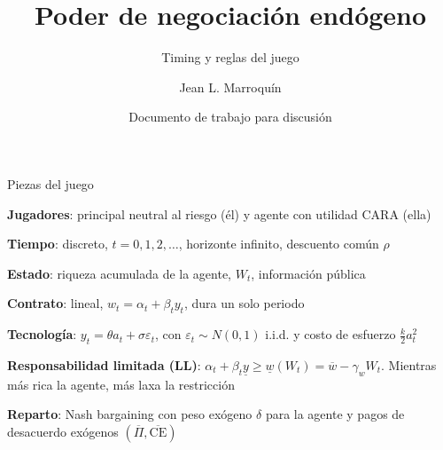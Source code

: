 \documentclass[12pt, aspectratio=169]{beamer}
\title{Poder de negociación endógeno}
\subtitle{Timing y reglas del juego}
\date{Documento de trabajo para discusión}
\author{Jean L. Marroquín}
\institute{CIDE}
\newenvironment{wideitemize}{\itemize\addtolength{\itemsep}{3pt}}{\enditemize}
\newcommand{\CE}{\text{CE}}
\begin{document}
\maketitle

\begin{frame}{Piezas del juego}
    \begin{wideitemize}
        \item \textbf{Jugadores}: principal neutral al riesgo (él) y agente con utilidad CARA (ella)
        \item \textbf{Tiempo}: discreto, $t=0,1,2,\dots$, horizonte infinito, descuento común $\rho$
        \item \textbf{Estado}: riqueza acumulada de la agente, $W_t$, información pública
        \item \textbf{Contrato}: lineal, $w_t=\alpha_t+\beta_t y_t$, dura un solo periodo
        \item \textbf{Tecnología}: $y_t=\theta a_t+\sigma\varepsilon_t$, con $\varepsilon_t\sim N(0,1)$ i.i.d. y costo de esfuerzo $\tfrac{k}{2}a_t^2$
        \item \textbf{Responsabilidad limitada (LL)}: $\alpha_t+\beta_t\underline{y}\ge\underline{w}(W_t)=\overline{w}-\gamma_w W_t$. Mientras más rica la agente, más laxa la restricción
        \item \textbf{Reparto}: Nash bargaining con peso exógeno $\delta$ para la agente y pagos de desacuerdo exógenos $(\overline{\Pi},\overline{\CE})$
    \end{wideitemize}
\end{frame}
\end{document}
